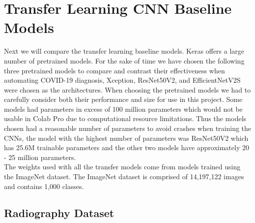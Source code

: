\section{Transfer Learning CNN Baseline Models}
Next we will compare the transfer learning baseline models. Keras offers a large number of pretrained models\cite{pretrainedModelsKeras}.  For the sake of time we have chosen the following three pretrained models to compare and contrast their effectiveness when automating COVID-19 diagnosis, Xception, ResNet50V2, and EfficientNetV2S were chosen as the architectures.  When choosing the pretrained models we had to carefully consider both their performance and size for use in this project.  Some models had parameters in excess of 100 million parameters which would not be usable in Colab Pro due to computational resource limitations.  Thus the models chosen had a reasonable number of parameters to avoid crashes when training the CNNs, the model with the highest number of parameters was ResNet50V2 which has 25.6M trainable parameters and the other two models have approximately 20 - 25 million parameters.  
\\
The weights used with all the transfer models come from models trained using the ImageNet dataset\cite{imageNet}.  The ImageNet dataset is comprised of 14,197,122 images and contains 1,000 classes.
\subsection{Radiography Dataset}
